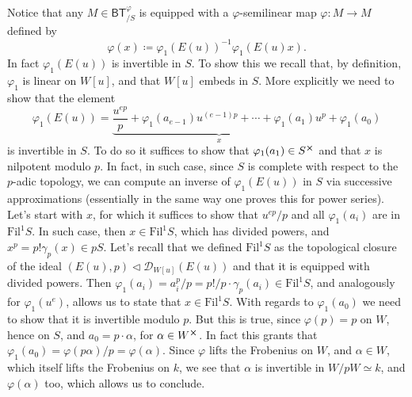 \begin{rem}[]\label{invertibilityphi1E(u))}
	Notice that any $M \in \mathsf{BT}^{\varphi}_{/S}$ is equipped with a 
	$\varphi$-semilinear map $\varphi\colon M \to M$ defined by
	\begin{equation*}
		\varphi (x) \coloneqq \varphi_1 \left( E(u) \right)^{-1} \varphi_1 (E(u)x)
	.\end{equation*}
	In fact $\varphi_1(E(u))$ is invertible in $S$.
	To show this we recall that, by definition, $\varphi_1$ is
	linear on $W[u]$, and that $W[u]$ embeds in $S$.
	More explicitly we need to show that the element
	\begin{equation*}
		\varphi_1(E(u)) =
		\underbrace{\frac{ u^{ep} }{ p } + \varphi_1(a_{e-1}) u^{(e-1)p} +
		\cdots + \varphi_1(a_1)u^p}_{x} + \varphi_1(a_0)
	\end{equation*}
	is invertible in $S$.
	To do so it suffices to show that $\varphi_1(a_1) \in S^{\cross}$ and
	that $x$ is nilpotent modulo $p$. 
	In fact, in such case, since $S$ is complete with respect to the
	$p$-adic topology, we can compute an inverse of $\varphi_1(E(u))$
	in $S$ via successive approximations (essentially in the same
	way one proves this for power series).
	Let's start with $x$, for which it suffices to show that 
	$u^{ep}/p$ and all $\varphi_1(a_i)$ are in $\mathrm{Fil}^1S$.
	In such case, then $x \in \mathrm{Fil}^1S$, which has divided powers,
	and $x^p = p! \gamma_p(x) \in pS$.
	Let's recall that we defined $\mathrm{Fil}^1S$ as the topological
	closure of the ideal $(E(u),p) \triangleleft \mathcal{D}_{W[u]}(E(u))$
	and that it is equipped with divided powers.
	Then $\varphi_1(a_i) = a_i^p/p = p!/p \cdot \gamma_p(a_i) \in \mathrm{Fil}^1S$,
	and analogously for $\varphi_1(u^e)$, allows us to state
	that $x \in \mathrm{Fil}^1S$.
	With regards to $\varphi_1(a_0)$ we need to show that it 
	is invertible modulo $p$.
	But this is true, since $\varphi(p) = p$ on $W$, hence on $S$,
	and $a_0 = p \cdot \alpha$, for $\alpha \in W^{\cross}$.
	In fact this grants that $\varphi_1(a_0) = \varphi(p \alpha)/p = \varphi(\alpha)$.
	Since $\varphi$ lifts the Frobenius on $W$, and $\alpha \in W$,
	which itself lifts the Frobenius on $k$, we see that $\alpha$
	is invertible in $W/pW \simeq k$, and $\varphi(\alpha)$ too,
	which allows us to conclude.
\end{rem}



